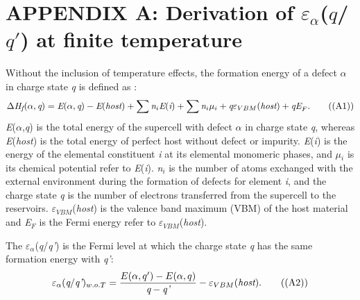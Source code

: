 \documentclass[onecolumn,preprint,superscriptaddress]{revtex4-1}
\begin{document}
\section*{APPENDIX A: Derivation of $\varepsilon$$_{\alpha}$(${q}$/${q'}$) at finite temperature}
Without the inclusion of temperature effects, the formation energy of a defect $\alpha$ in charge state \emph{q} is defined as \cite{12,13,50}:
\begin{equation}
\Delta\emph{H}_{\emph{f}}(\alpha,\emph{q})=\emph{E}(\alpha,\emph{q})-\emph{E}(\emph{host})+\sum\emph{n}_i\emph{E}(\emph{i})
+\sum\emph{n}_i\mu_i+\emph{q}\varepsilon_{VBM}(\emph{host})+\emph{qE}_F. \tag{(A1)}
\end{equation}
\noindent \emph{E}($\alpha$,\emph{q}) is the total energy of the supercell with defect $\alpha$ in charge state \emph{q}, whereas \emph{E}(\emph{host}) is the total energy of perfect host without defect or impurity. \emph{E}(\emph{i}) is the energy of the elemental constituent \emph{i} at its elemental monomeric phases, and $\mu$$_i$ is its chemical potential refer to \emph{E}(\emph{i}). \emph{n}$_i$ is the number of atoms exchanged with the external environment during the formation of defects for element \emph{i}, and the charge state \emph{q} is the number of electrons transferred from the supercell to the reservoirs. $\varepsilon$$_{VBM}$(\emph{host}) is the valence band maximum (VBM) of the host material and \emph{E}$_F$ is the Fermi energy refer to $\varepsilon$$_{VBM}$(\emph{host}).

The $\varepsilon$$_{\alpha}$(\emph{q}/\emph{q'}) is the Fermi level at which the charge state \emph{q} has the same formation energy with \emph{q'}:
\begin{equation}
\varepsilon_{\alpha}(\emph{q}/\emph{q'})_{w.o.T}=\frac{E(\alpha,q')-E(\alpha,q)}{\emph{q}-\emph{q'}}-\varepsilon_{VBM}(\emph{host}).   \tag{(A2)}
\end{equation}
\end{document}
